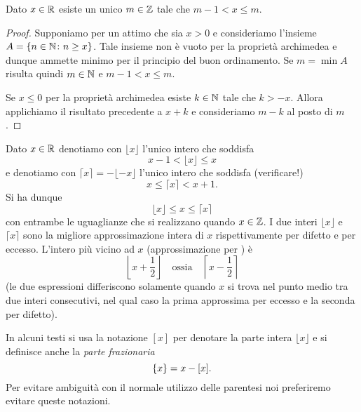 \begin{theorem}
\mymark{*}%
  Dato $x\in \mathbb R$ esiste un unico $m\in \mathbb Z$ tale che $m-1 < x \le m$.
\end{theorem}
%
\begin{proof}
  Supponiamo per un attimo che sia $x > 0$
  e consideriamo l'insieme $A={\left\{ n \in \mathbb N \colon n\ge x \right\}}$.
  Tale insieme non è vuoto per la proprietà archimedea 
  e dunque ammette minimo per il principio del buon ordinamento.
  Se $m=\min A$ risulta quindi $m\in \mathbb N$ e $m-1< x \le m$.

  Se $x\le 0$ per la proprietà archimedea esiste $k\in \mathbb N$ tale che 
  $k>-x$. Allora applichiamo il risultato precedente a $x+k$ e consideriamo 
  $m-k$ al posto di $m$.
\end{proof}

\begin{definition}
  \mymark{**}
  Dato $x\in \mathbb R$ denotiamo con $\lfloor x\rfloor$ l'unico intero
  che soddisfa
  \mynote{$\lfloor\cdot\rfloor$} %
  \[
    x - 1 < \lfloor x \rfloor \le x
  \]
  e denotiamo con $\lceil x \rceil = - \lfloor -x \rfloor$ l'unico intero che soddisfa (verificare!)
  \mynote{$\lceil\cdot\rceil$} %
  \[
    x \le \lceil x \rceil < x + 1.
  \]
  Si ha dunque
  \[
    \lfloor x \rfloor \le x \le \lceil x \rceil
  \]
  con entrambe le uguaglianze che si realizzano quando $x\in \mathbb Z$.
  I due interi $\lfloor x \rfloor$ e $\lceil x \rceil$
  sono la migliore approssimazione intera di $x$ rispettivamente
  per difetto e per eccesso.
  L'intero più vicino ad $x$ (approssimazione per )
  è
  \[
    \left\lfloor x + \frac 1 2 \right\rfloor
  \quad \text{ossia} \quad
    \left\lceil x-\frac 1 2 \right\rceil
  \]
  (le due espressioni differiscono solamente quando $x$ si trova nel punto medio tra due interi consecutivi, nel qual caso la prima approssima per eccesso e la seconda per difetto).
\end{definition}

In alcuni testi si usa la notazione $[x]$ per denotare la parte intera $\lfloor x \rfloor$ e si definisce
anche la \emph{parte frazionaria}
\[
  {\left\{ x \right\}} = x - [x].
\]
Per evitare ambiguità con il normale utilizzo delle parentesi
noi preferiremo evitare queste notazioni.
  
